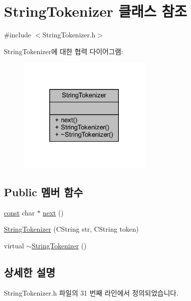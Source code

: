 \hypertarget{class_string_tokenizer}{}\section{String\+Tokenizer 클래스 참조}
\label{class_string_tokenizer}


{\ttfamily \#include $<$String\+Tokenizer.\+h$>$}



String\+Tokenizer에 대한 협력 다이어그램\+:\nopagebreak
\begin{figure}[H]
\begin{center}
\leavevmode
\includegraphics[width=185pt]{class_string_tokenizer__coll__graph}
\end{center}
\end{figure}
\subsection*{Public 멤버 함수}
\begin{DoxyCompactItemize}
\item 
\mbox{\hyperlink{getopt1_8c_a2c212835823e3c54a8ab6d95c652660e}{const}} char $\ast$ \mbox{\hyperlink{class_string_tokenizer_abeba9010a819d5d0bf8436894f71f049}{next}} ()
\item 
\mbox{\hyperlink{class_string_tokenizer_aad9d79efdc0b06f3ac696ed650d2f392}{String\+Tokenizer}} (C\+String str, C\+String token)
\item 
virtual \mbox{\hyperlink{class_string_tokenizer_a26a59cd69f871ace17ec831e1508b377}{$\sim$\+String\+Tokenizer}} ()
\end{DoxyCompactItemize}


\subsection{상세한 설명}


String\+Tokenizer.\+h 파일의 31 번째 라인에서 정의되었습니다.



